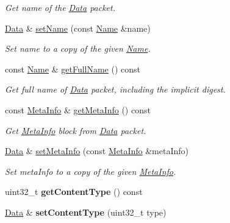 \begin{DoxyCompactItemize}
\begin{DoxyCompactList}\small\item\em Get name of the \hyperlink{classndn_1_1Data}{Data} packet. \end{DoxyCompactList}\item 
\hyperlink{classndn_1_1Data}{Data} \& \hyperlink{classndn_1_1Data_aedcc1a8147bcc8bb9cc926cfa5ce1a37}{set\+Name} (const \hyperlink{classndn_1_1Name}{Name} \&name)
\begin{DoxyCompactList}\small\item\em Set name to a copy of the given \hyperlink{classndn_1_1Name}{Name}. \end{DoxyCompactList}\item 
const \hyperlink{classndn_1_1Name}{Name} \& \hyperlink{classndn_1_1Data_a5eae643a1c9ba19a1927a73dd0ed2147}{get\+Full\+Name} () const
\begin{DoxyCompactList}\small\item\em Get full name of \hyperlink{classndn_1_1Data}{Data} packet, including the implicit digest. \end{DoxyCompactList}\item 
const \hyperlink{classndn_1_1MetaInfo}{Meta\+Info} \& \hyperlink{classndn_1_1Data_a93c1643864189c0ed5f93a11e90cd546}{get\+Meta\+Info} () const\hypertarget{classndn_1_1Data_a93c1643864189c0ed5f93a11e90cd546}{}\label{classndn_1_1Data_a93c1643864189c0ed5f93a11e90cd546}

\begin{DoxyCompactList}\small\item\em Get \hyperlink{classndn_1_1MetaInfo}{Meta\+Info} block from \hyperlink{classndn_1_1Data}{Data} packet. \end{DoxyCompactList}\item 
\hyperlink{classndn_1_1Data}{Data} \& \hyperlink{classndn_1_1Data_afb639a24406c68a31e6a7be91f4b2567}{set\+Meta\+Info} (const \hyperlink{classndn_1_1MetaInfo}{Meta\+Info} \&meta\+Info)
\begin{DoxyCompactList}\small\item\em Set meta\+Info to a copy of the given \hyperlink{classndn_1_1MetaInfo}{Meta\+Info}. \end{DoxyCompactList}\item 
uint32\+\_\+t {\bfseries get\+Content\+Type} () const\hypertarget{classndn_1_1Data_ad3417e0d2c610aa2b8c40f4c28ffb56f}{}\label{classndn_1_1Data_ad3417e0d2c610aa2b8c40f4c28ffb56f}

\item 
\hyperlink{classndn_1_1Data}{Data} \& {\bfseries set\+Content\+Type} (uint32\+\_\+t type)\hypertarget{classndn_1_1Data_af892304280cb97b9611057aaebbd8498}{}\label{classndn_1_1Data_af892304280cb97b9611057aaebbd8498}


\end{DoxyCompactItemize}
